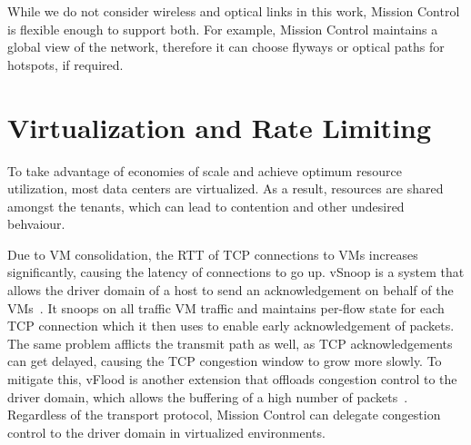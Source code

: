 \documentclass[a4paper,12pt,twoside,openright]{report}
\begin{document}
While we do not consider wireless and optical links in this work, Mission
Control is flexible enough to support both. For example, Mission Control
maintains a global view of the network, therefore it can choose flyways or
optical paths for hotspots, if required.

\section{Virtualization and Rate Limiting}
To take advantage of economies of scale and achieve optimum resource
utilization, most data centers are virtualized. As a result, resources are
shared amongst the tenants, which can lead to contention and other undesired
behvaiour.

Due to VM consolidation, the RTT of TCP connections to VMs increases
significantly, causing the latency of connections to go up. vSnoop is a system
that allows the driver domain of a host to send an acknowledgement on behalf of
the VMs~\cite{Kangarlou:2010:VIT}. It snoops on all traffic VM traffic and
maintains per-flow state for each TCP connection which it then uses to enable
early acknowledgement of packets. The same problem afflicts the transmit path as
well, as TCP acknowledgements can get delayed, causing the TCP congestion window
to grow more slowly. To mitigate this, vFlood is another extension that offloads
congestion control to the driver domain, which allows the buffering of a high
number of packets~\cite{Gamage:2011:OFI}. Regardless of the transport protocol,
Mission Control can delegate congestion control to the driver domain in
virtualized environments.
\end{document}
